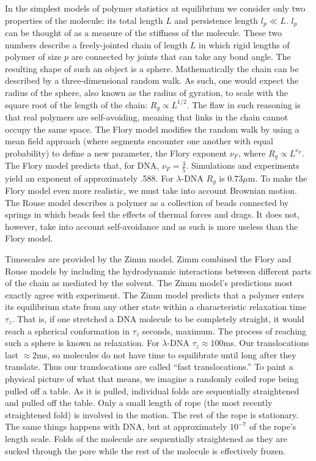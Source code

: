 \documentclass[aps,prl,preprint,groupedaddress]{revtex4}
\begin{document}
In the simplest models of polymer statistics at equilibrium we consider only two properties of the molecule: its total length \(L\) and persistence length \(l_p \ll L\).
\(l_p\) can be thought of as a measure of the stiffness of the molecule.
These two numbers describe a freely-jointed chain of length \(L\) in which rigid lengths of polymer of size \(p\) are connected by joints that can take any bond angle.
The resulting shape of such an object is a sphere.
Mathematically the chain can be described by a three-dimensional random walk.
As such, one would expect the radius of the sphere, also known as the radius of gyration, to scale with the square root of the length of the chain: \(R_g \propto L^{1/2}\).
The flaw in such reasoning is that real polymers are self-avoiding, meaning that links in the chain cannot occupy the same space.
The Flory model modifies the random walk by using a mean field approach (where segments encounter one another with equal probability) to define a new parameter, the Flory exponent \(\nu_F\), where \(R_g \propto L^{\nu_F}\).
The Flory model predicts that, for DNA, \(\nu_F = \frac{3}{5}\).
Simulations and experiments yield an exponent of approximately .588.\cite{exponent}
For \(\lambda\)-DNA \(R_g\) is \(0.73\mu\)m.
To make the Flory model even more realistic, we must take into account Brownian motion.
The Rouse model describes a polymer as a collection of beads connected by springs in which beads feel the effects of thermal forces and drags.
It does not, however, take into account self-avoidance and as such is more useless than the Flory model. 

Timescales are provided by the Zimm model.
Zimm combined the Flory and Rouse models by including the hydrodynamic interactions between different parts of the chain as mediated by the solvent.
The Zimm model's predictions most exactly agree with experiment. The Zimm model predicts that a polymer enters its equilibrium state from any other state within a characteristic relaxation time \(\tau_z\).
That is, if one stretched a DNA molecule to be completely straight, it would reach a spherical conformation in \(\tau_z\) seconds, maximum.
The process of reaching such a sphere is known as relaxation.
For \(\lambda\)-DNA \(\tau_z \approx 100\)ms.
Our translocations last \(\approx 2\)ms, so molecules do not have time to equilibrate until long after they translate.
Thus our translocations are called ``fast translocations.'' To paint a physical picture of what that means, we imagine a randomly coiled rope being pulled off a table.
As it is pulled, individual folds are sequentially straightened and pulled off the table.
Only a small length of rope (the most recently straightened fold) is involved in the motion.
The rest of the rope is stationary.
The same things happens with DNA, but at approximately $10^{-7}$ of the rope's length scale.
Folds of the molecule are sequentially straightened as they are sucked through the pore while the rest of the molecule is effectively frozen.
\end{document}
